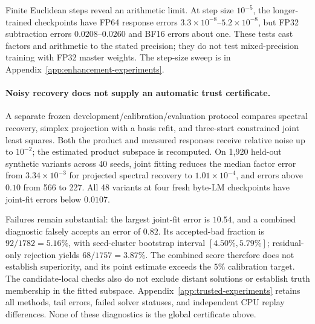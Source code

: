 \begingroup
\let\originaltable\table
\renewcommand{\table}[1][]{\originaltable[H]}

\endgroup

Finite Euclidean steps reveal an arithmetic limit. At step size $10^{-5}$,
the longer-trained checkpoints have FP64 response errors
$3.3\times10^{-8}$--$5.2\times10^{-8}$, but FP32 subtraction errors
$0.0208$--$0.0260$ and BF16 errors about one. These tests cast factors and
arithmetic to the stated precision; they do not test mixed-precision
training with FP32 master weights. The step-size sweep is in
Appendix~\ref{app:enhancement-experiments}.

\paragraph{Noisy recovery does not supply an automatic trust certificate.}
A separate frozen development/calibration/evaluation protocol compares
spectral recovery, simplex projection with a basis refit, and three-start
constrained joint least squares. Both the product and measured responses
receive relative noise up to $10^{-2}$; the estimated product subspace is
recomputed. On 1,920 held-out synthetic variants across 40 seeds, joint
fitting reduces the median factor error from $3.34\times10^{-3}$ for
projected spectral recovery to $1.01\times10^{-4}$, and errors above $0.10$
from 566 to 227. All 48 variants at four fresh byte-LM checkpoints have
joint-fit errors below $0.0107$.

Failures remain substantial: the largest joint-fit error is $10.54$, and a
combined diagnostic falsely accepts an error of $0.82$. Its accepted-bad
fraction is $92/1782=5.16\%$, with seed-cluster bootstrap interval
$[4.50\%,5.79\%]$; residual-only rejection yields $68/1757=3.87\%$.
The combined score therefore does not establish superiority, and its point
estimate exceeds the $5\%$ calibration target. The candidate-local checks
also do not exclude distant solutions or establish truth membership in the
fitted subspace. Appendix~\ref{app:trusted-experiments} retains all methods,
tail errors, failed solver statuses, and independent CPU replay differences.
None of these diagnostics is the global certificate above.


